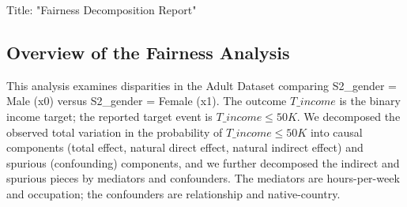 \documentclass{article}
\begin{document}
Title: "Fairness Decomposition Report"

\subsection*{Overview of the Fairness Analysis}
This analysis examines disparities in the Adult Dataset comparing S2\_gender = Male (x0) versus S2\_gender = Female (x1). The outcome $T\_income$ is the binary income target; the reported target event is $T\_income \leq 50K$. We decomposed the observed total variation in the probability of $T\_income \leq 50K$ into causal components (total effect, natural direct effect, natural indirect effect) and spurious (confounding) components, and we further decomposed the indirect and spurious pieces by mediators and confounders. The mediators are hours-per-week and occupation; the confounders are relationship and native-country.
\end{document}
